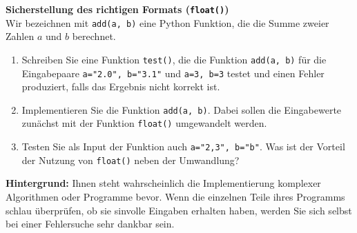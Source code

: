 \textbf{Sicherstellung des richtigen Formats (\texttt{float()})}\\
Wir bezeichnen mit \verb|add(a, b)| eine Python Funktion, die die Summe zweier Zahlen $a$ und $b$ berechnet.
\begin{enumerate}
	\item Schreiben Sie eine Funktion \verb|test()|, die die Funktion \verb|add(a, b)| für die Eingabepaare \verb|a="2.0", b="3.1"| und \verb|a=3, b=3| testet und einen Fehler produziert, falls das Ergebnis nicht korrekt ist.
	\item Implementieren Sie die Funktion \verb|add(a, b)|. Dabei sollen die Eingabewerte zunächst
	mit der Funktion \verb|float()|  umgewandelt werden.
	\item Testen Sie als Input der Funktion auch \verb|a="2,3", b="b"|. Was ist der Vorteil der Nutzung von \verb|float()| neben der Umwandlung?
\end{enumerate}

\textbf{Hintergrund: } Ihnen steht wahrscheinlich die Implementierung komplexer Algorithmen oder Programme bevor. Wenn die einzelnen Teile ihres Programms schlau überprüfen, ob sie sinvolle Eingaben erhalten haben, werden Sie sich selbst bei einer Fehlersuche sehr dankbar sein. \\
